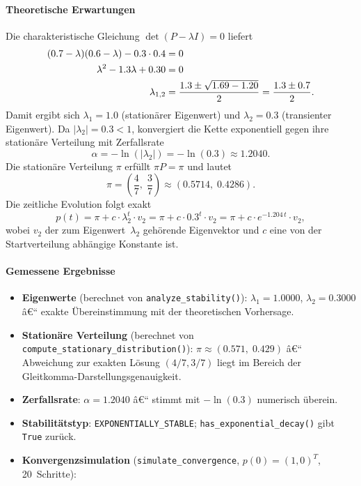 ﻿\documentclass[a4paper,12pt]{report}
\theoremstyle{definition}
\begin{document}
\paragraph{Theoretische Erwartungen}

Die charakteristische Gleichung $\det(P - \lambda I) = 0$ liefert
\begin{align}
	(0.7 - \lambda)(0.6 - \lambda) - 0.3 \cdot 0.4 &= 0 \notag \\
	\lambda^2 - 1.3\lambda + 0.30 &= 0 \notag \\
	\lambda_{1,2} &= \frac{1.3 \pm \sqrt{1.69 - 1.20}}{2}
	= \frac{1.3 \pm 0.7}{2}.
\end{align}
Damit ergibt sich $\lambda_1 = 1.0$ (stationärer Eigenwert) und
$\lambda_2 = 0.3$ (transienter Eigenwert).  Da $|\lambda_2| = 0.3 < 1$,
konvergiert die Kette exponentiell gegen ihre stationäre Verteilung mit
Zerfallsrate
\[
\alpha = -\ln(|\lambda_2|) = -\ln(0.3) \approx 1.2040.
\]
Die stationäre Verteilung $\pi$ erfüllt $\pi P = \pi$ und lautet
\[
\pi = \left(\frac{4}{7},\; \frac{3}{7}\right) \approx (0.5714,\; 0.4286).
\]
Die zeitliche Evolution folgt exakt
\begin{equation}
	p(t) = \pi + c \cdot \lambda_2^t \cdot v_2
	= \pi + c \cdot 0.3^t \cdot v_2
	= \pi + c \cdot e^{-1.204\,t} \cdot v_2,
	\label{eq:konvergenz}
\end{equation}
wobei $v_2$ der zum Eigenwert~$\lambda_2$ gehörende Eigenvektor und
$c$ eine von der Startverteilung abhängige Konstante ist.

\paragraph{Gemessene Ergebnisse}

\begin{itemize}
	\item \textbf{Eigenwerte} (berechnet von \texttt{analyze\_stability()}):
	$\lambda_1 = 1.0000$, $\lambda_2 = 0.3000$ â€“ exakte
	Übereinstimmung mit der theoretischen Vorhersage.
	
	\item \textbf{Stationäre Verteilung} (berechnet von
	\texttt{compute\_stationary\_distribu\newline tion()}):
	$\pi \approx (0.571,\; 0.429)$ â€“ Abweichung zur exakten
	Lösung $(4/7, 3/7)$ liegt im Bereich der
	Gleitkomma-Darstellungsgenauigkeit.
	
	\item \textbf{Zerfallsrate}: $\alpha = 1.2040$ â€“ stimmt mit
	$-\ln(0.3)$ numerisch überein.
	
	\item \textbf{Stabilitätstyp}: \texttt{EXPONENTIALLY\_STABLE};
	\texttt{has\_exponential\_decay()} gibt \texttt{True}
	zurück.
	
	\item \textbf{Konvergenzsimulation} (\texttt{simulate\_convergence},
	$p(0) = (1, 0)^T$, 20~Schritte):
\end{itemize}
\end{document}
